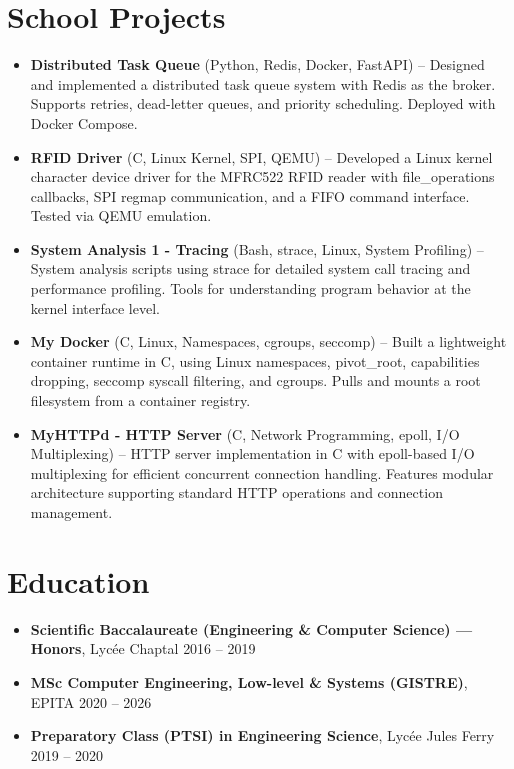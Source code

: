 \documentclass[9pt,a4paper]{article}
\begin{document}
\section*{School Projects}
\begin{tcolorbox}[mybox]
\begin{itemize}
\item \textbf{Distributed Task Queue} (Python, Redis, Docker, FastAPI) -- Designed and implemented a distributed task queue system with Redis as the broker. Supports retries, dead-letter queues, and priority scheduling. Deployed with Docker Compose.

\item \textbf{RFID Driver} (C, Linux Kernel, SPI, QEMU) -- Developed a Linux kernel character device driver for the MFRC522 RFID reader with file\_operations callbacks, SPI regmap communication, and a FIFO command interface. Tested via QEMU emulation.

\item \textbf{System Analysis 1 - Tracing} (Bash, strace, Linux, System Profiling) -- System analysis scripts using strace for detailed system call tracing and performance profiling. Tools for understanding program behavior at the kernel interface level.

\item \textbf{My Docker} (C, Linux, Namespaces, cgroups, seccomp) -- Built a lightweight container runtime in C, using Linux namespaces, pivot\_root, capabilities dropping, seccomp syscall filtering, and cgroups. Pulls and mounts a root filesystem from a container registry.

\item \textbf{MyHTTPd - HTTP Server} (C, Network Programming, epoll, I/O Multiplexing) -- HTTP server implementation in C with epoll-based I/O multiplexing for efficient concurrent connection handling. Features modular architecture supporting standard HTTP operations and connection management.
\end{itemize}
\end{tcolorbox}


\section*{Education}
\begin{tcolorbox}[mybox]
\begin{itemize}
\item \textbf{Scientific Baccalaureate (Engineering \& Computer Science) — Honors}, Lycée Chaptal {\small{\hfill 2016 – 2019}}

\item \textbf{MSc Computer Engineering, Low-level \& Systems (GISTRE)}, EPITA {\small{\hfill 2020 – 2026}}

\item \textbf{Preparatory Class (PTSI) in Engineering Science}, Lycée Jules Ferry {\small{\hfill 2019 – 2020}}
\end{itemize}
\end{tcolorbox}
\end{document}
